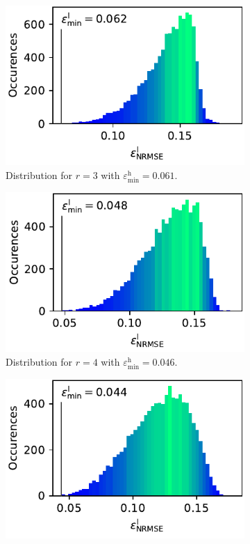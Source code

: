\documentclass[
  a4paper,  %
  twoside,  %
  bibliography=totoc,
  headsepline,
  cleardoublepage=empty,
  parskip=half,
  draft=false
]{scrbook}
\begin{document}
\begin{mdframed}[style=style]
\begin{figure}[H]
\begin{subfigure}{.5\textwidth}
  \centering
   \includegraphics[width=0.95\linewidth]{graphics/ww_hist_3}
  \caption{Distribution for $r=3$ with $\varepsilon^\mathrm{h}_{\mathrm{min}}=0.061$.}
\vspace{3mm}
\label{fig:ishigami_hist_2}
\end{subfigure}%
\begin{subfigure}{.5\textwidth}
  \centering
   \includegraphics[width=0.95\linewidth]{graphics/ww_hist_4}
  \caption{Distribution for $r=4$ with $\varepsilon^\mathrm{h}_{\mathrm{min}}=0.046$.}
\vspace{3mm}
\label{fig:ishigami_hist_3}
\end{subfigure}%
\vspace{3mm}
\begin{subfigure}{.5\textwidth}
  \centering
   \includegraphics[width=0.95\linewidth]{graphics/ww_hist_5}

\end{subfigure}
\end{figure}
\end{mdframed}
\end{document}
